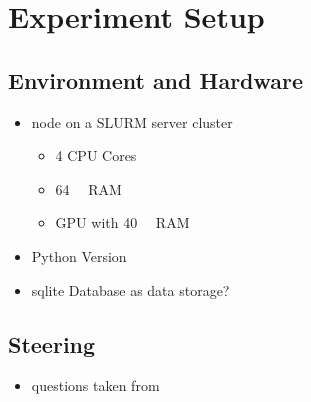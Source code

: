 \chapter{Experiment Setup}
\label{sec:experiment_setup}


\section{Environment and Hardware}
\label{sec:experiment_setup:environment_hardware}

\begin{itemize}
  \item node on a SLURM server cluster
        \begin{itemize}
          \item 4 CPU Cores %
          \item \SI{64}{\giga\byte} RAM %
          \item GPU with \SI{40}{\giga\byte} RAM
        \end{itemize}
  \item Python Version
  \item sqlite Database as data storage?
\end{itemize}

\section{Steering}
\label{sec:experiment_setup:steering}

\begin{itemize}
  \item questions taken from \citet{petroni-etal-2021-kilt,rooeinKnowYourAudience2023}
\end{itemize}